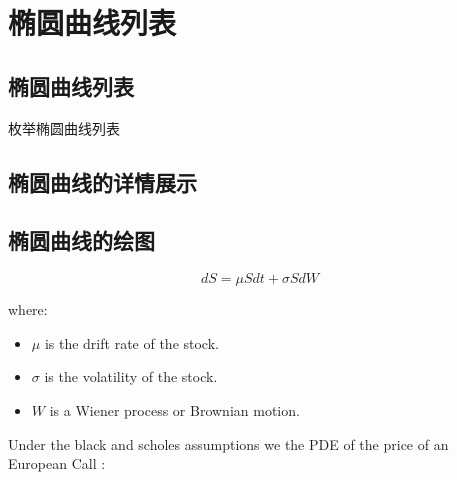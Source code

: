 \documentclass[../Main.tex]{subfiles}
\begin{document}
\chapter{椭圆曲线列表}


\section{椭圆曲线列表}
枚举椭圆曲线列表
\begin{enumerate}

\end{enumerate}

\section{椭圆曲线的详情展示}

\begin{enumerate}

\end{enumerate}

\section{椭圆曲线的绘图}


\begin{equation}
    dS = \mu S dt + \sigma S dW
\end{equation}

where:
\begin{itemize}
    \item \( \mu \) is the drift rate of the stock.
    \item \( \sigma \) is the volatility of the stock.
    \item \( W \) is a Wiener process or Brownian motion.
\end{itemize}


Under the black and scholes assumptions we the PDE of the price of an European Call :
\end{document}
